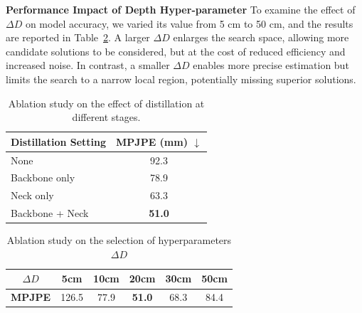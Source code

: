 \documentclass[journal]{IEEEtran}
\begin{document}
\textbf{Performance Impact of Depth Hyper-parameter}
To examine the effect of $\Delta D$ on model accuracy, we varied its value from 5 cm to 50 cm, and the results are reported in Table~\ref{The Importance of D}. A larger $\Delta D$ enlarges the search space, allowing more candidate solutions to be considered, but at the cost of reduced efficiency and increased noise. In contrast, a smaller $\Delta D$ enables more precise estimation but limits the search to a narrow local region, potentially missing superior solutions.
\begin{table}[h]
\centering
\caption{Ablation study on the effect of distillation at different stages.}
\renewcommand{\arraystretch}{1.1}
\small
\label{The Importance of Distillation}
\begin{tabular}{l|c}
\hline
\textbf{Distillation Setting} & \textbf{MPJPE (mm) $\downarrow$} \\
\hline
None & 92.3 \\
Backbone only & 78.9 \\
Neck only & 63.3 \\
Backbone + Neck & \textbf{51.0} \\
\hline
\end{tabular}
\end{table}
\begin{table}[!htb]
\centering
\caption{Ablation study on the selection of hyperparameters $\Delta D$ }
\renewcommand{\arraystretch}{1.1}
\small
\label{The Importance of D}
\begin{tabular}{c|ccccc}
\hline
\textbf{$\Delta D$} &  5cm &  10cm  &  20cm &  30cm &  50cm\\
\hline
\textbf{MPJPE} & 126.5  & 77.9 & \textbf{51.0} & 68.3 & 84.4\\

\hline
\end{tabular}
\end{table}
\end{document}
